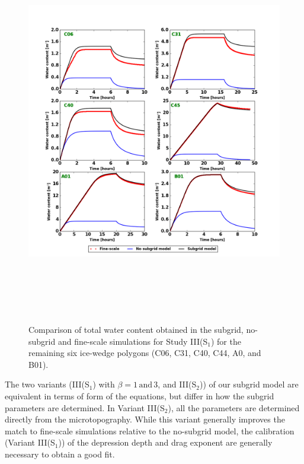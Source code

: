 %
\begin{figure}
\centering
\includegraphics[width=13.2cm, height=17cm]{./figures/new-model/all-polygons-watercontent.png}
\caption{Comparison of total water content obtained in the subgrid, no-subgrid and fine-scale simulations for Study III(S$_1$) for the remaining six ice-wedge polygons (C06, C31, C40, C44, A0, and B01).}
\label{all-polygons-watercontent}
\end{figure}
%

The two variants (III(S$_1$) with $\beta =1 \, \text{and} \, 3$, and III(S$_2$)) of our subgrid model are equivalent in terms of form of the equations, but differ in how the subgrid parameters are determined. In Variant III(S$_2$), all the parameters are determined directly from the microtopography. While this variant generally improves the match to fine-scale simulations relative to the no-subgrid model, the calibration (Variant III(S$_1$)) of the depression depth and drag exponent are generally necessary to obtain a good fit. 

%
\FloatBarrier
